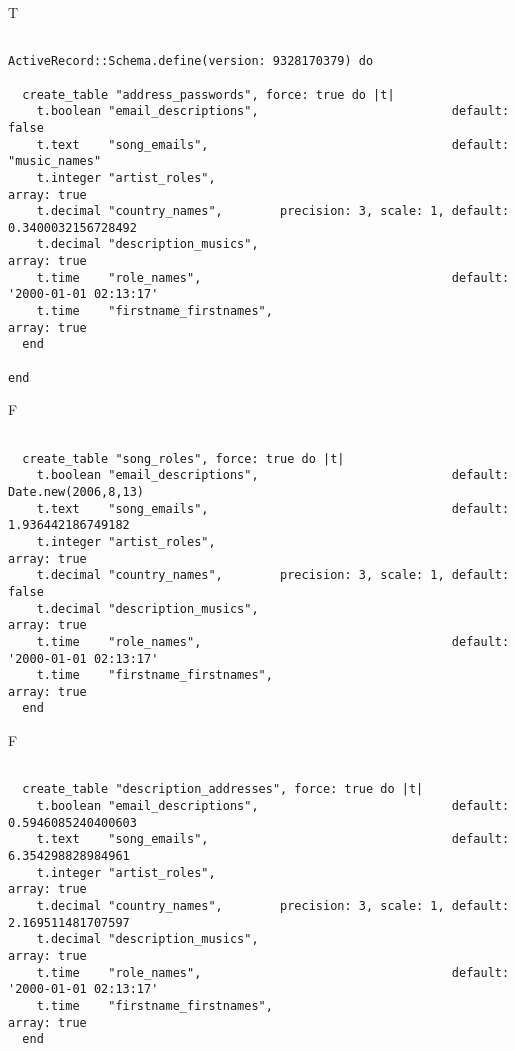 T
\begin{verbatim}

ActiveRecord::Schema.define(version: 9328170379) do

  create_table "address_passwords", force: true do |t|
    t.boolean "email_descriptions",                           default: false
    t.text    "song_emails",                                  default: "music_names"
    t.integer "artist_roles",                                                                 array: true
    t.decimal "country_names",        precision: 3, scale: 1, default: 0.3400032156728492
    t.decimal "description_musics",                                                           array: true
    t.time    "role_names",                                   default: '2000-01-01 02:13:17'
    t.time    "firstname_firstnames",                                                         array: true
  end

end
\end{verbatim}


F
\begin{verbatim}

  create_table "song_roles", force: true do |t|
    t.boolean "email_descriptions",                           default: Date.new(2006,8,13)
    t.text    "song_emails",                                  default: 1.936442186749182
    t.integer "artist_roles",                                                                 array: true
    t.decimal "country_names",        precision: 3, scale: 1, default: false
    t.decimal "description_musics",                                                           array: true
    t.time    "role_names",                                   default: '2000-01-01 02:13:17'
    t.time    "firstname_firstnames",                                                         array: true
  end

\end{verbatim}

F
\begin{verbatim}

  create_table "description_addresses", force: true do |t|
    t.boolean "email_descriptions",                           default: 0.5946085240400603
    t.text    "song_emails",                                  default: 6.354298828984961
    t.integer "artist_roles",                                                                 array: true
    t.decimal "country_names",        precision: 3, scale: 1, default: 2.169511481707597
    t.decimal "description_musics",                                                           array: true
    t.time    "role_names",                                   default: '2000-01-01 02:13:17'
    t.time    "firstname_firstnames",                                                         array: true
  end

\end{verbatim}

